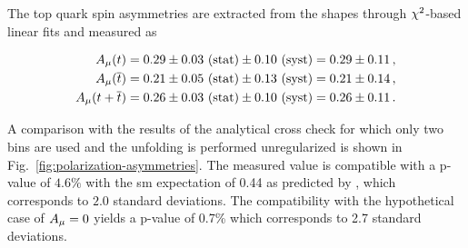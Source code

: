 The top quark spin asymmetries are extracted from the shapes through $\chi^\scriptn{2}$-based linear fits and measured as

\newcommand{\AlResultCombined}{\ensuremath{0.26\pm 0.11 }\xspace}
\newcommand{\AlResultCombinedStatSys}{\ensuremath{0.26\pm 0.03~\mathrm{(stat)}\pm 0.10~\mathrm{(syst)}} \xspace}
\newcommand{\AlResultCombinedPvalue}{\ensuremath{4.6\% }\xspace}
\newcommand{\AlResultCombinedSvalue}{\ensuremath{2.0}\xspace}

\newcommand{\AlResultTop}{\ensuremath{0.29\pm 0.11 }\xspace}
\newcommand{\AlResultTopStatSys}{\ensuremath{0.29 \pm 0.03~\mathrm{(stat)} \pm 0.10~\mathrm{(syst)} }\xspace}
\newcommand{\AlResultTopPvalue}{\ensuremath{7.9\% } \xspace}
\newcommand{\AlResultTopSvalue}{\ensuremath{1.8}\xspace}

\newcommand{\AlResultAntiTop}{\ensuremath{0.21\pm 0.14 }\xspace}
\newcommand{\AlResultAntiTopStatSys}{\ensuremath{0.21\pm 0.05~\mathrm{(stat)}\pm 0.13~\mathrm{(syst)}}\xspace}
\newcommand{\AlResultAntiTopPvalue}{\ensuremath{5.0\% }\xspace}
\newcommand{\AlResultAntiTopSvalue}{\ensuremath{2.0}\xspace}

\begin{subequations}
\begin{align}
\AmuT          & = \AlResultTopStatSys = \AlResultTop\,, \\
\AmuTbar       & = \AlResultAntiTopStatSys = \AlResultAntiTop\,, \\
\AmuTplusTbar & = \AlResultCombinedStatSys = \AlResultCombined\,.
\end{align}
\end{subequations}

A comparison with the results of the analytical cross check for which only two bins are used and the unfolding is performed unregularized is shown in Fig.~\ref{fig:polarization-asymmetries}. The measured \AmuTplusTbar value is compatible with a p-value of \AlResultCombinedPvalue with the \gls{sm} expectation of 0.44 as predicted by \POWHEG, which corresponds to \AlResultCombinedSvalue standard deviations. The compatibility with the hypothetical case of $A_{\mu}=0$ yields a p-value of 0.7\% which corresponds to 2.7 standard deviations.






